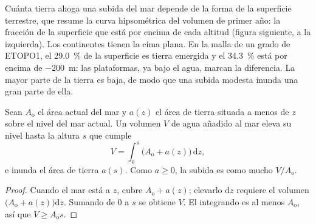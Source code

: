 Cuánta tierra ahoga una subida del mar depende de la forma de la superficie terrestre, que resume la
curva hipsométrica del volumen de primer año: la fracción de la superficie que está por encima de
cada altitud (figura siguiente, a la izquierda). Los continentes tienen la cima plana. En la malla de un grado de
ETOPO1, el \qty{29.0}{\percent} de la superficie es tierra emergida y el \qty{34.3}{\percent} está por encima de
\qty{-200}{m}: las plataformas, ya bajo el agua, marcan la diferencia. La mayor parte de la tierra es baja, de modo que una
subida modesta inunda una gran parte de ella.

\begin{proposition}\label{prop:b2:phanerozoic-earth:flooding}
Sean $A_{\text{o}}$ el área actual del mar y $a(z)$ el área de tierra situada a menos de $z$ sobre el
nivel del mar actual. Un volumen $V$ de agua añadido al mar eleva su nivel hasta la altura $s$
que cumple
\[
V = \int_0^s \bigl(A_{\text{o}} + a(z)\bigr)\,\mathrm{d}z ,
\]
e inunda el área de tierra $a(s)$. Como $a \ge 0$, la subida es como mucho $V/A_{\text{o}}$.
\end{proposition}

\begin{proof}
Cuando el mar está a $z$, cubre $A_{\text{o}} + a(z)$; elevarlo $\mathrm{d}z$ requiere
el volumen $\bigl(A_{\text{o}} + a(z)\bigr)\mathrm{d}z$. Sumando de 0 a $s$ se obtiene $V$. El
integrando es al menos $A_{\text{o}}$, así que $V \ge A_{\text{o}}s$.
\end{proof}

